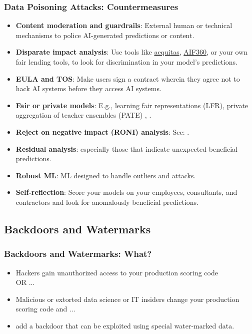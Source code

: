 \documentclass[11pt,
               aspectratio=169,
               hyperref={colorlinks}
               ]{beamer}
\begin{document}
			\begin{frame}[label={slide:data_poisoning_defense}]
		
				\frametitle{Data Poisoning Attacks: \textbf{Countermeasures}}
				
				\begin{itemize}\small
					\item \textbf{Content moderation and guardrails}: External human or technical mechanisms to police AI-generated predictions or content.
					\item \textbf{Disparate impact analysis}: Use tools like \href{https://github.com/dssg/aequitas}{aequitas}, \href{https://github.com/IBM/AIF360}{AIF360}, or your own fair lending tools, to look for discrimination in your model’s predictions. \
					\item \textbf{EULA and TOS}: Make users sign a contract wherein they agree not to hack AI systems before they access AI systems. 
					\item \textbf{Fair or private models}: E.g., learning fair representations (LFR), private aggregation of teacher ensembles (PATE) \cite{pate}, \cite{lfr}.
					\item \textbf{Reject on negative impact (RONI) analysis}: See: \textit{\citefield{security_of_ml}{title}} \cite{security_of_ml}. 		
					\item \textbf{Residual analysis}: especially those that indicate unexpected beneficial predictions.
					\item \textbf{Robust ML}: ML designed to handle outliers and attacks.
					\item \textbf{Self-reflection}: Score your models on your employees, consultants, and contractors and look for anomalously beneficial predictions.
				\end{itemize}	
			\end{frame}
		
		\subsection{Backdoors and Watermarks}
			
			\begin{frame}
		
				\frametitle{Backdoors and Watermarks: \textbf{What?}}
				\begin{itemize}
				\Large
				\item Hackers gain unauthorized access to your production scoring code \\ OR ...
				\item Malicious or extorted data science or IT insiders change your production scoring code and ...
				\item add a backdoor that can be exploited using special water-marked data.
				\end{itemize}	
			\end{frame}
		
\end{document}
